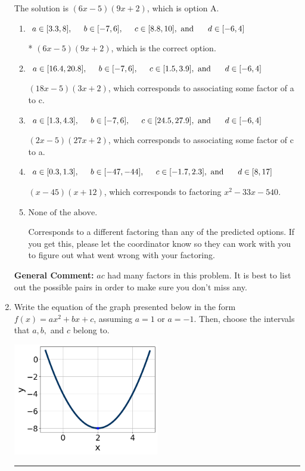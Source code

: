 \documentclass{extbook}[14pt]
\newcommand{\litem}[1]{\item #1

\rule{\textwidth}{0.4pt}}
\begin{document}
\begin{enumerate}
{The solution is \( (6x -5)(9x + 2) \), which is option A.\begin{enumerate}[label=\Alph*.]
\item \( a \in [3.3, 8], \hspace*{5mm} b \in [-7, 6], \hspace*{5mm} c \in [8.8, 10], \text{ and } \hspace*{5mm} d \in [-6, 4] \)

* $(6x -5)(9x + 2)$, which is the correct option.
\item \( a \in [16.4, 20.8], \hspace*{5mm} b \in [-7, 6], \hspace*{5mm} c \in [1.5, 3.9], \text{ and } \hspace*{5mm} d \in [-6, 4] \)

 $(18x -5)(3x + 2)$, which corresponds to associating some factor of a to c.
\item \( a \in [1.3, 4.3], \hspace*{5mm} b \in [-7, 6], \hspace*{5mm} c \in [24.5, 27.9], \text{ and } \hspace*{5mm} d \in [-6, 4] \)

 $(2x -5)(27x + 2)$, which corresponds to associating some factor of c to a.
\item \( a \in [0.3, 1.3], \hspace*{5mm} b \in [-47, -44], \hspace*{5mm} c \in [-1.7, 2.3], \text{ and } \hspace*{5mm} d \in [8, 17] \)

 $(x -45)(x + 12)$, which corresponds to factoring $x^{2} -33 x -540$.
\item \( \text{None of the above.} \)

 Corresponds to a different factoring than any of the predicted options. If you get this, please let the coordinator know so they can work with you to figure out what went wrong with your factoring.
\end{enumerate}

\textbf{General Comment:} $ac$ had many factors in this problem. It is best to list out the possible pairs in order to make sure you don't miss any.
}
\litem{
Write the equation of the graph presented below in the form $f(x)=ax^2+bx+c$, assuming  $a=1$ or $a=-1$. Then, choose the intervals that $a, b,$ and $c$ belong to.

\begin{center}
    \includegraphics[width=0.5\textwidth]{../Figures/quadraticGraphToEquationCopyC.png}
\end{center}




}
\end{enumerate}
\end{document}
